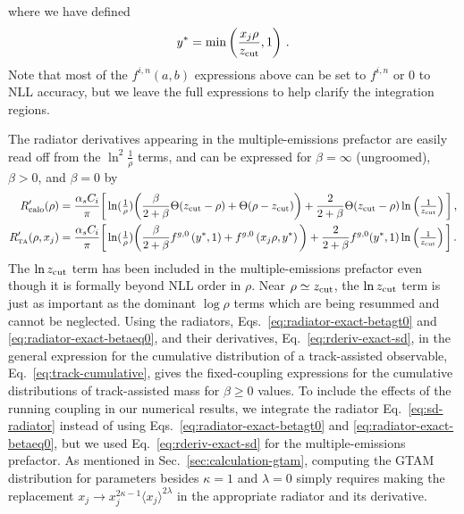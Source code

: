 \documentclass[letterpaper,11pt]{article}
\newcommand{\Sec}[1]{Sec.~\ref{#1}}
\newcommand{\Eq}[1]{Eq.~\eqref{#1}}
\newcommand{\Eqs}[2]{Eqs.~\eqref{#1} and \eqref{#2}}
\begin{document}
where we have defined
\begin{equation}
y^* = \min \left(\frac{x_j\rho}{z_{\rm cut}},1\right)\,.
\end{equation}
Note that most of the $f^{i,n}(a,b)$ expressions above can be set to $f^{i,n}$ or 0 to NLL accuracy, but we leave the full expressions to help clarify the integration regions.


The radiator derivatives appearing in the multiple-emissions prefactor are easily read off from the $\ln^2\tfrac{1}{\rho}$ terms, and can be expressed for $\beta = \infty$ (ungroomed), $\beta > 0$, and $\beta = 0$ by
\begin{align}
\label{eq:rderiv-exact-sd}
\nonumber
R_{\rm calo}'(\rho) &= \frac{\alpha_sC_i}{\pi} \bigg[\ln(\tfrac{1}{\rho})\bigg(\frac{\beta}{2+\beta} \Theta(z_{\rm cut}-\rho) + \Theta(\rho-z_{\rm cut})\bigg) + \frac{2}{2+\beta}\Theta(z_{\rm cut}-\rho)\ln\left(\tfrac{1}{z_{\rm cut}}\right)\bigg]\,,\\
R_{\mbox{\tiny TA}}'(\rho,x_j) &= \frac{\alpha_sC_i}{\pi} \bigg[\ln(\tfrac{1}{\rho})\bigg(\frac{\beta}{2+\beta} f^{g,0}\left(y^*,1\right) + f^{g,0}\left(x_j\rho,y^*\right)\bigg) + \frac{2}{2+\beta}f^{g,0}(y^*,1)\ln\left(\tfrac{1}{z_{\rm cut}}\right)\bigg]\,.
\end{align}
The $\ln z_{\rm cut}$ term has been included in the multiple-emissions prefactor even though it is formally beyond NLL order in $\rho$. 
%
Near $\rho \simeq z_{\rm cut}$, the $\ln z_{\rm cut} $ term is just as important as the dominant $\log \rho$ terms which are being resummed and cannot be neglected. 
%
Using the radiators, \Eqs{eq:radiator-exact-betagt0}{eq:radiator-exact-betaeq0}, and their derivatives, \Eq{eq:rderiv-exact-sd}, in the general expression for the cumulative distribution of a track-assisted observable, \Eq{eq:track-cumulative}, gives the fixed-coupling expressions for the cumulative distributions of track-assisted mass for $\beta\ge 0$ values. 
%
To include the effects of the running coupling in our numerical results, we integrate the radiator \Eq{eq:sd-radiator} instead of using \Eqs{eq:radiator-exact-betagt0}{eq:radiator-exact-betaeq0}, but we used \Eq{eq:rderiv-exact-sd} for the multiple-emissions prefactor. 
%
As mentioned in \Sec{sec:calculation-gtam}, computing the GTAM distribution for parameters besides $\kappa = 1$ and $\lambda = 0$ simply requires making the replacement $x_j \rightarrow x_j^{2\kappa-1}\langle x_j\rangle^{2\lambda}$ in the appropriate radiator and its derivative. 
\end{document}
